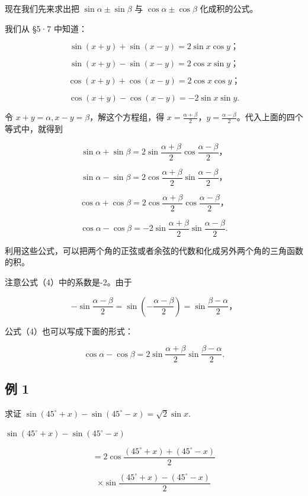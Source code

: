 现在我们先来求出把 \(\sin \alpha \pm \sin \beta\) 与
\(\cos \alpha \pm \cos \beta\) 化成积的公式。

我们从 §5·7 中知道：

\[
\sin (x + y) + \sin (x - y) = 2 \sin x \cos y\text{；}
\]

\[
\sin (x + y) - \sin (x - y) = 2 \cos x \sin y\text{；}
\]

\[
\cos (x + y) + \cos (x - y) = 2 \cos x \cos y\text{；}
\]

\[
\cos (x + y) - \cos (x - y) = - 2 \sin x \sin y.
\]

令 \(x + y = \alpha, x - y = \beta\)，解这个方程组，得
\(x = \frac{\alpha + \beta}{2}\)，\(y = \frac{\alpha - \beta}{2}\)。代入上面的四个等式中，就得到

\[
\sin \alpha + \sin \beta = 2 \sin \frac {\alpha + \beta}{2} \cos \frac {\alpha - \beta}{2}\text{，} \tag {1}
\]

\[
\sin \alpha - \sin \beta = 2 \cos \frac {\alpha + \beta}{2} \sin \frac {\alpha - \beta}{2}\text{，} \tag {2}
\]

\[
\cos \alpha + \cos \beta = 2 \cos \frac {\alpha + \beta}{2} \cos \frac {\alpha - \beta}{2}\text{，} \tag {3}
\]

\[
\cos \alpha - \cos \beta = - 2 \sin \frac {\alpha + \beta}{2} \sin \frac {\alpha - \beta}{2}. \tag {4}
\]

利用这些公式，可以把两个角的正弦或者余弦的代数和化成另外两个角的三角函数的积。

注意公式（4）中的系数是-2。由于

\[
- \sin \frac {\alpha - \beta}{2} = \sin \left(- \frac {\alpha - \beta}{2}\right) = \sin \frac {\beta - \alpha}{2}\text{，}
\]

公式（4）也可以写成下面的形式：

\[
\cos \alpha - \cos \beta = 2 \sin \frac {\alpha + \beta}{2} \sin \frac {\beta - \alpha}{2}. \tag{4′}
\]

\subsection{例 1}

求证 \(\sin(45^{\circ}+x)-\sin(45^{\circ}-x)=\sqrt{2}\sin x.\)

 \(\sin (45^{\circ} + x) - \sin (45^{\circ} - x)\)

\[
= 2 \cos \frac {(45 ^{\circ} + x) + (45 ^{\circ} - x)}{2}
\]

\[
\times \sin \frac {(45 ^{\circ} + x) - (45 ^{\circ} - x)}{2}
\]

